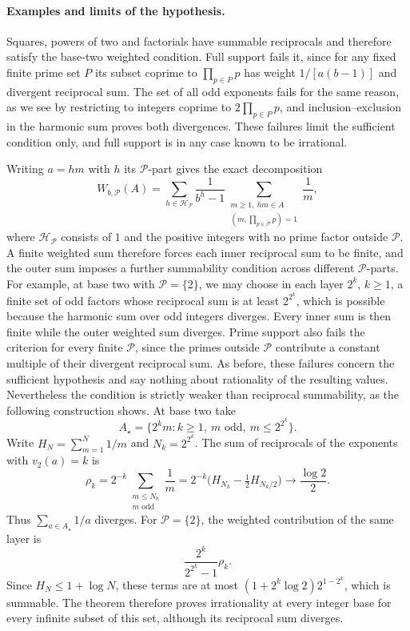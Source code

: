 \documentclass[11pt]{article}
\theoremstyle{plain}
\theoremstyle{definition}
\theoremstyle{remark}
\providecommand{\m}[1]{\ensuremath{#1}}
\begin{document}
\paragraph{Examples and limits of the hypothesis.}
Squares, powers of two and factorials have summable reciprocals and
therefore satisfy the base-two weighted condition. Full support fails it,
since for any fixed finite prime set $P$ its subset coprime to
$\prod_{p\in P}p$ has weight $1/[a(b-1)]$ and divergent reciprocal sum.
The set of all odd exponents fails for the same reason, as we see by
restricting to integers coprime to $2\prod_{p\in P}p$, and
inclusion--exclusion in the harmonic sum proves both divergences. These
failures limit the sufficient condition only, and full support is in any
case known to be irrational.

Writing $a=hm$ with $h$ its $\mathcal P$-part gives the exact decomposition
\[
 W_{b,\mathcal P}(A)=\sum_{h\in\mathcal H_{\mathcal P}}\frac1{b^h-1}
       \sum_{\substack{m\ge1,\ hm\in A\\(m,\prod_{p\in\mathcal P}p)=1}}\frac1m,
\]
where $\mathcal H_{\mathcal P}$ consists of $1$ and the positive
integers with no prime factor outside $\mathcal P$. A finite weighted
sum therefore forces each inner reciprocal sum to be finite, and the
outer sum imposes a further summability condition across different
$\mathcal P$-parts. For example, at base two with $\mathcal P=\{2\}$, we
may choose in each layer $2^k$, $k\ge1$, a finite set of odd factors whose
reciprocal sum is at least $2^{2^k}$, which is possible because the
harmonic sum over odd integers diverges. Every inner sum is then finite
while the outer weighted sum diverges. Prime support also fails the
criterion for every finite $\mathcal P$, since the primes outside
$\mathcal P$ contribute a constant multiple of their divergent
reciprocal sum. As before, these failures concern the sufficient
hypothesis and say nothing about rationality of the resulting values.
Nevertheless the condition is strictly weaker than reciprocal
summability, as the following construction shows.
At base two take
\[
 A_\star=\{2^k m:k\ge1,\ m\text{ odd},\ m\le2^{2^k}\}.
\]
Write $H_N=\sum_{m=1}^N1/m$ and $N_k=2^{2^k}$. The sum of reciprocals
of the exponents with $v_2(a)=k$ is
\[
 \rho_k=2^{-k}\!\sum_{\substack{m\le N_k\\m\text{ odd}}}\frac1m
 =2^{-k}\bigl(H_{N_k}-\tfrac12H_{N_k/2}\bigr)
 \longrightarrow\frac{\log2}{2}.
\]
Thus $\sum_{a\in A_\star}1/a$ diverges.  For $\mathcal P=\{2\}$,
the weighted contribution of the same layer is
\[
 \frac{2^k}{2^{2^k}-1}\rho_k.
\]
Since $H_N\le1+\log N$, these terms are at most
$(1+2^k\log2)2^{1-2^k}$, which is summable.  The theorem therefore proves
irrationality at every integer base for every infinite subset of this set,
although its reciprocal sum diverges.
\end{document}
